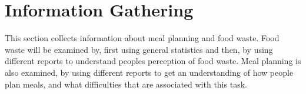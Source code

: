 \chapter{Information Gathering}\label{InformationGathering}
This section collects information about meal planning and food waste. Food waste will be examined by, first using general statistics and then, by using different reports to understand peoples perception of food waste. Meal planning is also examined, by using different reports to get an understanding of how people plan meals, and what difficulties that are associated with this task. 
 






%


%
